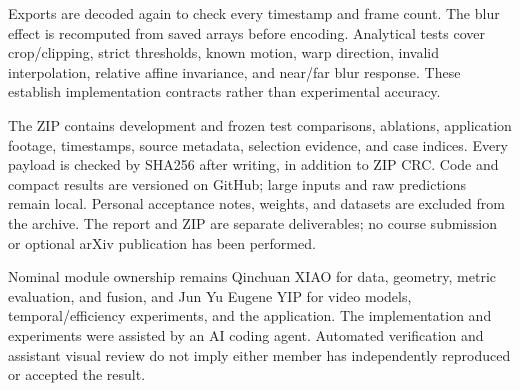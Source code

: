 Exports are decoded again to check every timestamp and frame count. The blur effect is recomputed from saved arrays before encoding. Analytical tests cover crop/clipping, strict thresholds, known motion, warp direction, invalid interpolation, relative affine invariance, and near/far blur response. These establish implementation contracts rather than experimental accuracy.

The ZIP contains development and frozen test comparisons, ablations, application footage, timestamps, source metadata, selection evidence, and case indices. Every payload is checked by SHA256 after writing, in addition to ZIP CRC. Code and compact results are versioned on GitHub; large inputs and raw predictions remain local. Personal acceptance notes, weights, and datasets are excluded from the archive. The report and ZIP are separate deliverables; no course submission or optional arXiv publication has been performed.

Nominal module ownership remains Qinchuan XIAO for data, geometry, metric evaluation, and fusion, and Jun Yu Eugene YIP for video models, temporal/efficiency experiments, and the application. The implementation and experiments were assisted by an AI coding agent. Automated verification and assistant visual review do not imply either member has independently reproduced or accepted the result.
